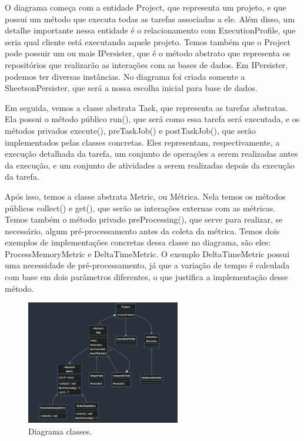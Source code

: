 \documentclass[12pt]{tcc}
\begin{document}
O diagrama começa com a entidade Project, que representa um projeto, e que possui um método que executa todas as tarefas associadas a ele.
Além disso, um detalhe importante nessa entidade é o relacionamento com ExecutionProfile, que seria qual cliente está executando aquele projeto. Temos também que o Project pode possuir um ou mais IPersister, que é o método abstrato que representa os repositórios que realizarão as interações com as bases de dados. Em IPersister, podemos ter diversas instâncias.
No diagrama foi criada somente a SheetsonPersister, que será a nossa escolha inicial para base de dados.

Em seguida, vemos a classe abstrata Task, que representa as tarefas abstratas.
Ela possui o método público run(), que será como essa tarefa será executada, e os métodos privados execute(), preTaskJob() e postTaskJob(), que serão implementados pelas classes concretas.
Eles representam, respectivamente, a execução detalhada da tarefa, um conjunto de operações a serem realizadas antes da execução, e um conjunto de atividades a serem realizadas depois da execução da tarefa.

Após isso, temos a classe abstrata Metric, ou Métrica.
Nela temos os métodos públicos collect() e get(), que serão as interações externas com as métricas.
Temos também o método privado preProcessing(), que serve para realizar, se necessário, algum pré-processamento antes da coleta da métrica.
Temos dois exemplos de implementações concretas dessa classe no diagrama, são eles:
ProcessMemoryMetric e DeltaTimeMetric. O exemplo DeltaTimeMetric possui uma necessidade de pré-processamento, já que a variação de tempo é calculada com base em dois parâmetros diferentes, o que justifica a implementação desse método.


\begin{figure}[!ht]
	\centering
	\includegraphics[width=0.6\textwidth]{figures/diagrama-classes.png}
	\caption{Diagrama classes.}
	\label{fig:diag-classes}
\end{figure}
\end{document}
